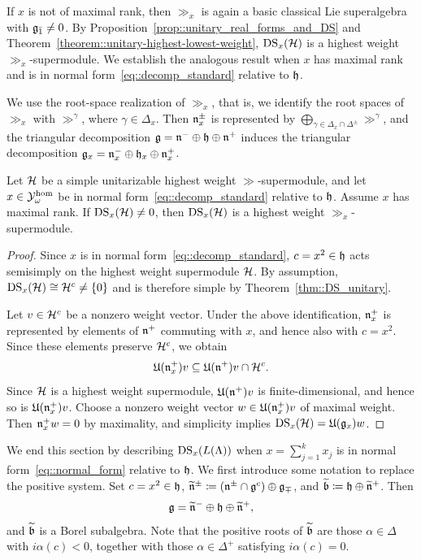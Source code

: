 If $x$ is not of maximal rank, then $\gg_x$ is again a basic classical Lie superalgebra with ${\mathfrak{g}_{\bar{1}}}\neq0$. By Proposition~\ref{prop::unitary_real_forms_and_DS} and Theorem~\ref{theorem::unitary-highest-lowest-weight}, $\operatorname{DS}_x({\mathcal{H}})$ is a highest weight $\gg_x$-supermodule. We establish the analogous result when $x$ has maximal rank and is in normal form~\eqref{eq::decomp_standard} relative to ${\mathfrak h}$.

We use the root-space realization of $\gg_x$, that is, we identify the root spaces of $\gg_{x}$ with $\gg^{\gamma}$, where $\gamma \in \Delta_{x}$. Then ${\mathfrak{n}}_x^{\pm}$ is represented by $\bigoplus_{\gamma\in\Delta_x\cap\Delta^{\pm}}\gg^\gamma$, and the triangular decomposition ${\mathfrak{g}}={\mathfrak{n}}^-\oplus{\mathfrak h}\oplus{\mathfrak{n}}^+$ induces the triangular decomposition ${\mathfrak{g}}_x={\mathfrak{n}}_x^-\oplus{\mathfrak h}_x\oplus{\mathfrak{n}}_x^+$.

\begin{lemma}\label{lemm::DS_is_HW}
Let ${\mathcal{H}}$ be a simple unitarizable highest weight $\gg$-supermodule, and let $x\in{\mathcal Y}_\omega^{\hom}$ be in normal form~\eqref{eq::decomp_standard} relative to ${\mathfrak h}$. Assume $x$ has maximal rank. If $\operatorname{DS}_x({\mathcal{H}})\neq0$, then $\operatorname{DS}_x({\mathcal{H}})$ is a highest weight $\gg_x$-supermodule.
\end{lemma}


\begin{proof} 
Since $x$ is in normal form~\eqref{eq::decomp_standard}, $c=x^2\in{\mathfrak h}$ acts semisimply on the highest weight supermodule ${\mathcal{H}}$. By assumption, $\operatorname{DS}_x({\mathcal{H}})\cong{\mathcal{H}}^c\neq \{0\}$ and is therefore simple by Theorem~\ref{thm::DS_unitary}.


Let $v\in{\mathcal{H}}^c$ be a nonzero weight vector. Under the above identification, ${\mathfrak{n}}_x^+$ is represented by elements of ${\mathfrak{n}}^+$ commuting with $x$, and hence also with $c=x^2$. Since these elements preserve ${\mathcal{H}}^c$, we obtain
\begin{equation*}
{\mathfrak U}({\mathfrak{n}}_x^+)v\subseteq{\mathfrak U}({\mathfrak{n}}^+)v\cap{\mathcal{H}}^c.
\end{equation*}
Since ${\mathcal{H}}$ is a highest weight supermodule, ${\mathfrak U}({\mathfrak{n}}^+)v$ is finite-dimensional, and hence so is ${\mathfrak U}({\mathfrak{n}}_x^+)v$. Choose a nonzero weight vector $w\in{\mathfrak U}({\mathfrak{n}}_x^+)v$ of maximal weight. Then ${\mathfrak{n}}_x^+w=0$ by maximality, and simplicity implies $\operatorname{DS}_x({\mathcal{H}})={\mathfrak U}({\mathfrak{g}}_x)w$.
\end{proof}


We end this section by describing $\operatorname{DS}_x(L(\Lambda))$ when $x=\sum_{j=1}^k x_j$ is in normal form~\eqref{eq::normal_form} relative to ${\mathfrak h}$. We first introduce some notation to replace the positive system. Set $c=x^2\in{\mathfrak h}$,
$\widetilde{{\mathfrak{n}}}^{\pm}\coloneqq({\mathfrak{n}}^{\pm}\cap{\mathfrak{g}}^c)\oplus{\mathfrak{g}}_{\mp}$, and $\widetilde{{\mathfrak b}}\coloneqq{\mathfrak h}\oplus\widetilde{{\mathfrak{n}}}^+$. Then
\begin{equation*}
{\mathfrak{g}}=\widetilde{{\mathfrak{n}}}^-\oplus{\mathfrak h}\oplus\widetilde{{\mathfrak{n}}}^+,
\end{equation*}
and $\widetilde{{\mathfrak b}}$ is a Borel subalgebra. 
Note that the positive roots of $\widetilde{{\mathfrak b}}$ are those $\alpha\in\Delta$ with $i\alpha(c)<0$, together with those $\alpha\in\Delta^+$ satisfying $i\alpha(c)=0$.


